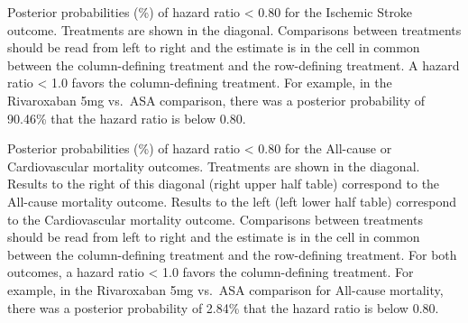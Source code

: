 \documentclass[
  12pt,
]{article}
\begin{document}
Posterior probabilities (\%) of hazard ratio \textless{} 0.80 for the
Ischemic Stroke outcome. Treatments are shown in the diagonal.
Comparisons between treatments should be read from left to right and the
estimate is in the cell in common between the column-defining treatment
and the row-defining treatment. A hazard ratio \textless{} 1.0 favors
the column-defining treatment. For example, in the Rivaroxaban 5mg
vs.~ASA comparison, there was a posterior probability of 90.46\% that
the hazard ratio is below 0.80.

\begin{table}[!h]

\caption{\label{tab:unnamed-chunk-43}All-cause and Cardiovascular Mortality}
\centering
{}
\end{table}

Posterior probabilities (\%) of hazard ratio \textless{} 0.80 for the
All-cause or Cardiovascular mortality outcomes. Treatments are shown in
the diagonal. Results to the right of this diagonal (right upper half
table) correspond to the All-cause mortality outcome. Results to the
left (left lower half table) correspond to the Cardiovascular mortality
outcome. Comparisons between treatments should be read from left to
right and the estimate is in the cell in common between the
column-defining treatment and the row-defining treatment. For both
outcomes, a hazard ratio \textless{} 1.0 favors the column-defining
treatment. For example, in the Rivaroxaban 5mg vs.~ASA comparison for
All-cause mortality, there was a posterior probability of 2.84\% that
the hazard ratio is below 0.80.

\newpage
\end{document}
